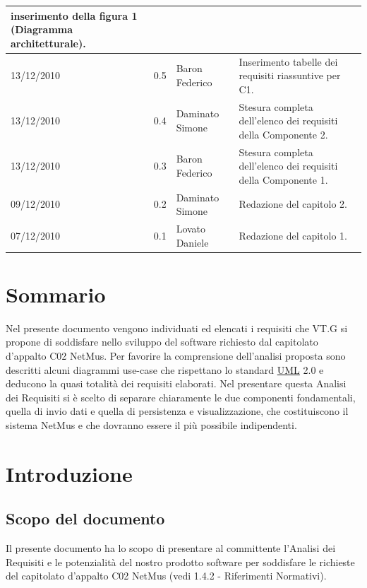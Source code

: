 \begin{longtable}{|p{}|c|p{}|p{}|}
inserimento della figura 1 (Diagramma architetturale).\\
\hline
13/12/2010 & 0.5 & Baron Federico & Inserimento tabelle dei requisiti
riassuntive per C1.\\
\hline
13/12/2010 & 0.4 & Daminato Simone & Stesura completa dell'elenco dei requisiti
della Componente 2.\\
\hline
13/12/2010 & 0.3 & Baron Federico & Stesura completa dell'elenco dei requisiti
della Componente 1.\\
\hline
09/12/2010 & 0.2 & Daminato Simone & Redazione del capitolo 2.\\
\hline
07/12/2010 & 0.1 & Lovato Daniele & Redazione del capitolo 1.\\
\end{longtable}


\tableofcontents

\chapter*{Sommario}
Nel presente documento vengono individuati ed elencati i requisiti che VT.G si
propone di soddisfare nello sviluppo del software richiesto dal capitolato
d'appalto C02 NetMus. Per favorire la comprensione dell'analisi proposta sono
descritti alcuni diagrammi use-case che rispettano lo standard \underline{UML}
2.0 e deducono la quasi totalit\`a dei requisiti elaborati.
Nel presentare questa Analisi dei Requisiti si \`e scelto di separare
chiaramente le due componenti fondamentali, quella di invio dati e quella di persistenza e
visualizzazione, che costituiscono il sistema NetMus e che dovranno essere il
pi\`u possibile indipendenti.

\thispagestyle{fancy} %

\chapter{Introduzione}
\thispagestyle{fancy} %

\section{Scopo del documento}
Il presente documento ha lo scopo di presentare al committente l'Analisi dei
Requisiti e le potenzialit\`a del nostro prodotto software per soddisfare le
richieste del capitolato d'appalto C02 NetMus (vedi 1.4.2 - Riferimenti
Normativi).

